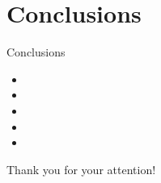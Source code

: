 \section{Conclusions}

\begin{frame}{Conclusions}
    \begin{itemize}
        \item 
        \item[]
        \item 
        \item[]
        \item 
    \end{itemize}
\end{frame}

\begin{frame}
    \begin{center}
        \Huge Thank you for your attention!
    \end{center}
\end{frame}
